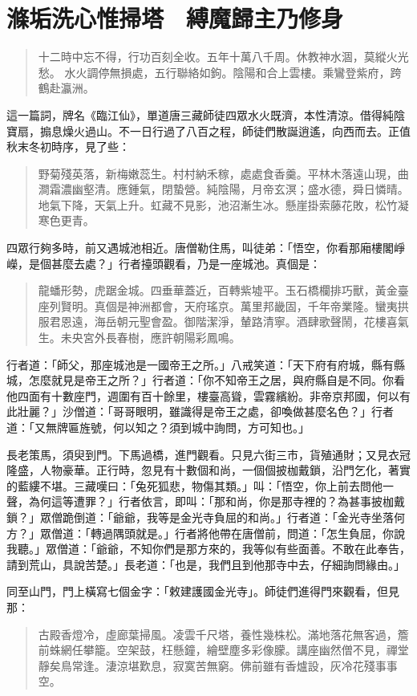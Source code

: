 
\chapter{滌垢洗心惟掃塔　縛魔歸主乃修身}

\begin{quote}
十二時中忘不得，行功百刻全收。五年十萬八千周。休教神水涸，莫縱火光愁。
水火調停無損處，五行聯絡如鉤。陰陽和合上雲樓。乘鸞登紫府，跨鶴赴瀛洲。
\end{quote}

這一篇詞，牌名《臨江仙》，單道唐三藏師徒四眾水火既濟，本性清涼。借得純陰寶扇，搧息燥火過山。不一日行過了八百之程，師徒們散誕逍遙，向西而去。正值秋末冬初時序，見了些：
\begin{quote}
野菊殘英落，新梅嫩蕊生。村村納禾稼，處處食香羹。平林木落遠山現，曲澗霜濃幽壑清。應鍾氣，閉蟄營。純陰陽，月帝玄溟；盛水德，舜日憐晴。地氣下降，天氣上升。虹藏不見影，池沼漸生冰。懸崖掛索藤花敗，松竹凝寒色更青。
\end{quote}

四眾行夠多時，前又遇城池相近。唐僧勒住馬，叫徒弟：「悟空，你看那廂樓閣崢嶸，是個甚麼去處？」行者擡頭觀看，乃是一座城池。真個是：
\begin{quote}
龍蟠形勢，虎踞金城。四垂華蓋近，百轉紫墟平。玉石橋欄排巧獸，黃金臺座列賢明。真個是神洲都會，天府瑤京。萬里邦畿固，千年帝業隆。蠻夷拱服君恩遠，海岳朝元聖會盈。御階潔淨，輦路清寧。酒肆歌聲鬧，花樓喜氣生。未央宮外長春樹，應許朝陽彩鳳鳴。
\end{quote}

行者道：「師父，那座城池是一國帝王之所。」八戒笑道：「天下府有府城，縣有縣城，怎麼就見是帝王之所？」行者道：「你不知帝王之居，與府縣自是不同。你看他四面有十數座門，週圍有百十餘里，樓臺高聳，雲霧繽紛。非帝京邦國，何以有此壯麗？」沙僧道：「哥哥眼明，雖識得是帝王之處，卻喚做甚麼名色？」行者道：「又無牌匾旌號，何以知之？須到城中詢問，方可知也。」

長老策馬，須臾到門。下馬過橋，進門觀看。只見六街三市，貨殖通財；又見衣冠隆盛，人物豪華。正行時，忽見有十數個和尚，一個個披枷戴鎖，沿門乞化，著實的藍縷不堪。三藏嘆曰：「兔死狐悲，物傷其類。」叫：「悟空，你上前去問他一聲，為何這等遭罪？」行者依言，即叫：「那和尚，你是那寺裡的？為甚事披枷戴鎖？」眾僧跪倒道：「爺爺，我等是金光寺負屈的和尚。」行者道：「金光寺坐落何方？」眾僧道：「轉過隅頭就是。」行者將他帶在唐僧前，問道：「怎生負屈，你說我聽。」眾僧道：「爺爺，不知你們是那方來的，我等似有些面善。不敢在此奉告，請到荒山，具說苦楚。」長老道：「也是，我們且到他那寺中去，仔細詢問緣由。」

同至山門，門上橫寫七個金字：「敕建護國金光寺」。師徒們進得門來觀看，但見那：
\begin{quote}
古殿香燈冷，虛廊葉掃風。凌雲千尺塔，養性幾株松。滿地落花無客過，簷前蛛網任攀籠。空架鼓，枉懸鐘，繪壁塵多彩像朦。講座幽然僧不見，禪堂靜矣鳥常逢。淒涼堪歎息，寂寞苦無窮。佛前雖有香爐設，灰冷花殘事事空。
\end{quote}

